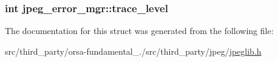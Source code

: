 \subsubsection[{trace\+\_\+level}]{\setlength{\rightskip}{0pt plus 5cm}int jpeg\+\_\+error\+\_\+mgr\+::trace\+\_\+level}\label{structjpeg__error__mgr_a77328bf266cc3c3c4d9741fc27a4ef9b}


The documentation for this struct was generated from the following file\+:\begin{DoxyCompactItemize}
\item 
src/third\+\_\+party/orsa-\/fundamental\+\_./src/third\+\_\+party/jpeg/\hyperlink{jpeglib_8h}{jpeglib.\+h}\end{DoxyCompactItemize}
